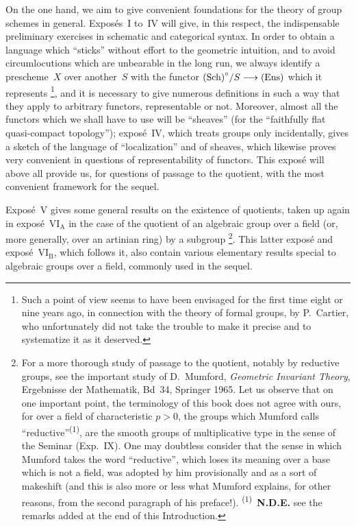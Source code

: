 On the one hand, we aim to give convenient foundations for the theory of
group schemes in general. Expos\'es~I to~IV will give, in this respect, the
indispensable preliminary exercises in schematic and categorical syntax. In
order to obtain a language which ``sticks'' without effort to the geometric
intuition, and to avoid circumlocutions which are unbearable in the long
run, we always identify a prescheme~$X$ over another~$S$ with the functor
\(\textup{(Sch)}^{\circ}/S\longrightarrow\textup{(Ens)}\) which it represents%
{\renewcommand{\thefootnote}{(*)}\footnote{Such a point of view seems to have
been envisaged for the first time eight or nine years ago, in connection
with the theory of formal groups, by P.~Cartier, who unfortunately did not
take the trouble to make it precise and to systematize it as it
deserved.}},
and it is necessary to give numerous definitions in such a way that they
apply to arbitrary functors, representable or not. Moreover, almost all the
functors which we shall have to use will be ``sheaves'' (for the ``faithfully
flat quasi-compact topology''); expos\'e~IV, which treats groups only incidentally, gives a sketch of the language of ``localization'' and of
sheaves, which likewise proves very convenient in questions of
representability of functors. This expos\'e will above all provide us, for
questions of passage to the quotient, with the most convenient framework for
the sequel.

Expos\'e~V gives some general results on the existence of quotients, taken
up again in expos\'e~$\mathrm{VI}_{\mathrm{A}}$ in the case of the quotient
of an algebraic group over a field (or, more generally, over an artinian
ring) by a subgroup%
{\renewcommand{\thefootnote}{(**)}\footnote{For a more thorough study of
passage to the quotient, notably by reductive groups, see the important
study of D.~Mumford, \emph{Geometric Invariant Theory}, Ergebnisse der
Mathematik, Bd~34, Springer 1965. Let us observe that on one important
point, the terminology of this book does not agree with ours, for over a
field of characteristic \(p > 0\), the groups which Mumford calls
``reductive''\textsuperscript{(1)}, are the smooth groups of multiplicative
type in the sense of the Seminar (\cf Exp.~IX). One may doubtless consider
that the sense in which Mumford takes the word ``reductive'', which loses
its meaning over a base which is not a field, was adopted by him
provisionally and as a sort of makeshift (and this is also more or less what
Mumford explains, for other reasons, from the second paragraph of his
preface!). \textsuperscript{(1)}~\textbf{N.D.E.} see the remarks added at
the end of this Introduction.}}.
This latter expos\'e and expos\'e~$\mathrm{VI}_{\mathrm{B}}$, which follows
it, also contain various elementary results special to algebraic groups over
a field, commonly used in the sequel.

